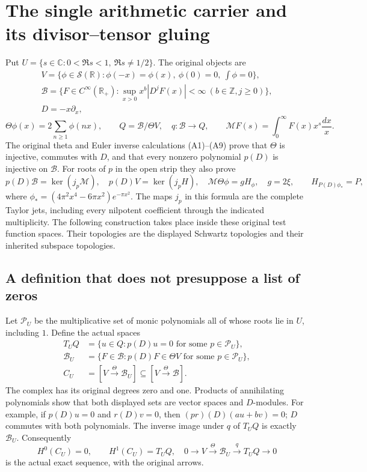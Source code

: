 \section{The single arithmetic carrier and its divisor--tensor gluing}
\label{CFStage:sec:actual-arithmetic-gluing}

Put $U=\{s\in\mathbb C:0<\Re s<1,\ \Re s\ne1/2\}$.
The original objects are
\[
 \begin{gathered}
 V=\{\phi\in\mathcal S(\mathbb R):\phi(-x)=\phi(x),\
 \phi(0)=0,\ \int\phi=0\},\\
 \mathscr B=\{F\in C^\infty(\mathbb R_+):
 \sup_{x>0}x^b|D^jF(x)|<\infty\ (b\in\mathbb Z,j\ge0)\},\\
 D=-x\partial_x,
 \end{gathered}
\]
\[
 \Theta\phi(x)=2\sum_{n\ge1}\phi(nx),\qquad
 Q=\mathscr B/\Theta V,\quad q:\mathscr B\to Q,\qquad
 \mathcal MF(s)=\int_0^\infty F(x)x^s\frac{dx}{x}.
\]
The original theta and Euler inverse calculations (A1)--(A9) prove
that $\Theta$ is injective, commutes with $D$, and that every
nonzero polynomial $p(D)$ is injective on $\mathscr B$.  For roots of $p$
in the open strip they also prove
\[
 p(D)\mathscr B=\ker(j_p\mathcal M),\quad
 p(D)V=\ker(j_pH),\quad
 \mathcal M\Theta\phi=gH_\phi,\quad g=2\xi,
 \qquad H_{P(D)\phi_*}=P,
 \tag{AG1}
\]
where $\phi_*=(4\pi^2x^4-6\pi x^2)e^{-\pi x^2}$.
The maps $j_p$ in this formula are the complete Taylor jets, including
every nilpotent coefficient through the indicated multiplicity.
The following construction takes place inside these original test
function spaces.  Their topologies are the displayed Schwartz
topologies and their inherited subspace topologies.

\subsection{A definition that does not presuppose a list of zeros}

Let $\mathcal P_U$ be the multiplicative set of monic polynomials all
of whose roots lie in $U$, including $1$.  Define the actual spaces
\[
 \begin{split}
 T_UQ&=\{u\in Q:p(D)u=0\text{ for some }p\in\mathcal P_U\},\\
 \mathscr B_U&=\{F\in\mathscr B:p(D)F\in\Theta V
                         \text{ for some }p\in\mathcal P_U\},\\
 C_U&=[V\xrightarrow{\Theta}\mathscr B_U]
              \subseteq[V\xrightarrow{\Theta}\mathscr B].
 \end{split}\tag{AG2}
\]
The complex has its original degrees zero and one.  Products of
annihilating polynomials show that both displayed sets are vector
spaces and $D$-modules.  For example, if $p(D)u=0$ and $r(D)v=0$,
then $(pr)(D)(au+bv)=0$; $D$ commutes with both polynomials.
The inverse image under $q$ of $T_UQ$ is exactly $\mathscr B_U$.
Consequently
\[
 H^0(C_U)=0,\qquad H^1(C_U)=T_UQ,
 \quad 0\to V\xrightarrow{\Theta}\mathscr B_U
                         \xrightarrow{q}T_UQ\to0
 \tag{AG3}
\]
is the actual exact sequence, with the original arrows.

